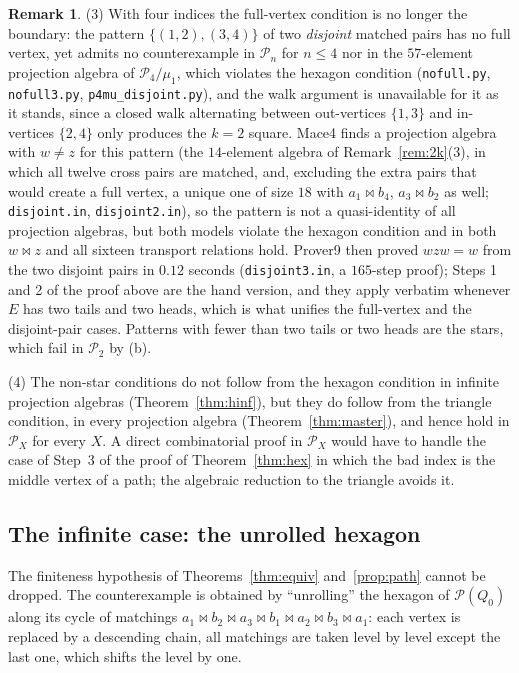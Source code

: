 \documentclass[11pt]{amsart}
\theoremstyle{definition}
\newtheorem{remark}[theorem]{Remark}
\renewcommand{\P}{\mathcal{P}}
\begin{document}
\begin{remark}
(3) With four indices the full-vertex condition is no longer the boundary: the pattern $\{(1,2),(3,4)\}$ of two \emph{disjoint} matched pairs has no full vertex, yet admits no counterexample in $\P_n$ for $n\le4$ nor in the $57$-element projection algebra of $\P_4/\mu_1$, which violates the hexagon condition (\texttt{nofull.py}, \texttt{nofull3.py}, \texttt{p4mu\_disjoint.py}), and the walk argument is unavailable for it as it stands, since a closed walk alternating between out-vertices $\{1,3\}$ and in-vertices $\{2,4\}$ only produces the $k=2$ square. Mace4 finds a projection algebra with $w\ne z$ for this pattern (the $14$-element algebra of Remark~\ref{rem:2k}(3), in which all twelve cross pairs are matched, and, excluding the extra pairs that would create a full vertex, a unique one of size $18$ with $a_1\bowtie b_4$, $a_3\bowtie b_2$ as well; \texttt{disjoint.in}, \texttt{disjoint2.in}), so the pattern is not a quasi-identity of all projection algebras, but both models violate the hexagon condition and in both $w\bowtie z$ and all sixteen transport relations hold. Prover9 then proved $wzw=w$ from the two disjoint pairs in $0.12$ seconds (\texttt{disjoint3.in}, a $165$-step proof); Steps 1 and 2 of the proof above are the hand version, and they apply verbatim whenever $E$ has two tails and two heads, which is what unifies the full-vertex and the disjoint-pair cases. Patterns with fewer than two tails or two heads are the stars, which fail in $\P_2$ by (b).

(4) The non-star conditions do not follow from the hexagon condition in infinite projection algebras (Theorem~\ref{thm:hinf}), but they do follow from the triangle condition, in every projection algebra (Theorem~\ref{thm:master}), and hence hold in $\P_X$ for every $X$. A direct combinatorial proof in $\P_X$ would have to handle the case of Step~3 of the proof of Theorem~\ref{thm:hex} in which the bad index is the middle vertex of a path; the algebraic reduction to the triangle avoids it.
\end{remark}

\subsection{The infinite case: the unrolled hexagon}\label{subsec:hinf}

The finiteness hypothesis of Theorems~\ref{thm:equiv} and~\ref{prop:path} cannot be dropped. The counterexample is obtained by ``unrolling'' the hexagon of $\P(Q_0)$ along its cycle of matchings $a_1\bowtie b_2\bowtie a_3\bowtie b_1\bowtie a_2\bowtie b_3\bowtie a_1$: each vertex is replaced by a descending chain, all matchings are taken level by level except the last one, which shifts the level by one.
\end{document}
